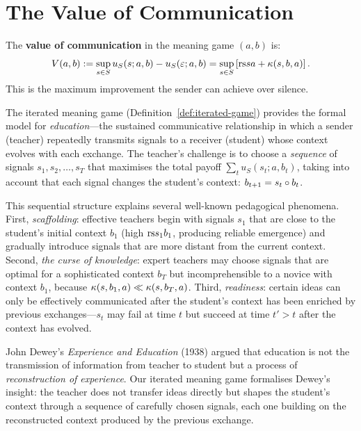\section{The Value of Communication}

\begin{definition}
\label{def:value}
The \textbf{value of communication} in the meaning game $(a, b)$ is:
\[
  V(a, b) := \sup_{s \in S} u_S(s; a, b) - u_S(\varepsilon; a, b)
  = \sup_{s \in S} \left[\mathrm{rs}{s}{a} + \kappa(s, b, a)\right].
\]
This is the maximum improvement the sender can achieve over silence.
\end{definition}

\begin{interpretation}
\label{interp:ch14:iterated_education}
The iterated meaning game (Definition~\ref{def:iterated-game}) provides the
formal model for \emph{education}---the sustained communicative relationship
in which a sender (teacher) repeatedly transmits signals to a receiver
(student) whose context evolves with each exchange.  The teacher's challenge
is to choose a \emph{sequence} of signals $s_1, s_2, \ldots, s_T$ that
maximises the total payoff $\sum_t u_S(s_t; a, b_t)$, taking into account
that each signal changes the student's context: $b_{t+1} = s_t \circ b_t$.

This sequential structure explains several well-known pedagogical phenomena.
First, \emph{scaffolding}: effective teachers begin with signals $s_1$ that
are close to the student's initial context $b_1$ (high $\mathrm{rs}{s_1}{b_1}$,
producing reliable emergence) and gradually introduce signals that are more
distant from the current context.  Second, \emph{the curse of knowledge}:
expert teachers may choose signals that are optimal for a sophisticated
context $b_T$ but incomprehensible to a novice with context $b_1$, because
$\kappa(s, b_1, a) \ll \kappa(s, b_T, a)$.  Third, \emph{readiness}:
certain ideas can only be effectively communicated after the student's
context has been enriched by previous exchanges---$s_t$ may fail at time $t$
but succeed at time $t' > t$ after the context has evolved.

John Dewey's \emph{Experience and Education} (1938) argued that education is
not the transmission of information from teacher to student but a process of
\emph{reconstruction of experience}.  Our iterated meaning game formalises
Dewey's insight: the teacher does not transfer ideas directly but shapes the
student's context through a sequence of carefully chosen signals, each one
building on the reconstructed context produced by the previous exchange.
\end{interpretation}



